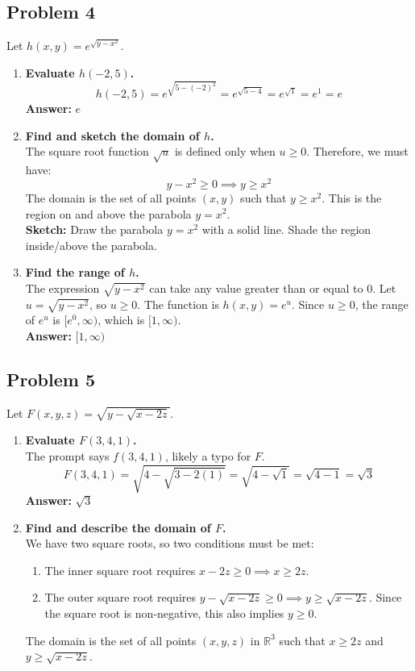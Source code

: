 \documentclass{article}
\begin{document}
\subsection{Problem 4}
Let $h(x, y) = e^{\sqrt{y - x^2}}$.
\begin{enumerate}[label=\alph*.]
    \item \textbf{Evaluate $h(-2, 5)$.} \\
    \[ h(-2, 5) = e^{\sqrt{5 - (-2)^2}} = e^{\sqrt{5-4}} = e^{\sqrt{1}} = e^1 = e \]
    \textbf{Answer:} $e$

    \item \textbf{Find and sketch the domain of $h$.} \\
    The square root function $\sqrt{u}$ is defined only when $u \ge 0$. Therefore, we must have:
    \[ y - x^2 \ge 0 \implies y \ge x^2 \]
    The domain is the set of all points $(x, y)$ such that $y \ge x^2$. This is the region on and above the parabola $y = x^2$. \\
    \textbf{Sketch:} Draw the parabola $y=x^2$ with a solid line. Shade the region inside/above the parabola.

    \item \textbf{Find the range of $h$.} \\
    The expression $\sqrt{y - x^2}$ can take any value greater than or equal to 0. Let $u = \sqrt{y - x^2}$, so $u \ge 0$. The function is $h(x, y) = e^u$. Since $u \ge 0$, the range of $e^u$ is $[e^0, \infty)$, which is $[1, \infty)$. \\
    \textbf{Answer:} $[1, \infty)$
\end{enumerate}

\subsection{Problem 5}
Let $F(x, y, z) = \sqrt{y - \sqrt{x - 2z}}$.
\begin{enumerate}[label=\alph*.]
    \item \textbf{Evaluate $F(3, 4, 1)$.} \\
    The prompt says $f(3,4,1)$, likely a typo for $F$.
    \[ F(3, 4, 1) = \sqrt{4 - \sqrt{3 - 2(1)}} = \sqrt{4 - \sqrt{1}} = \sqrt{4 - 1} = \sqrt{3} \]
    \textbf{Answer:} $\sqrt{3}$

    \item \textbf{Find and describe the domain of $F$.} \\
    We have two square roots, so two conditions must be met:
    \begin{enumerate}
        \item The inner square root requires $x - 2z \ge 0 \implies x \ge 2z$.
        \item The outer square root requires $y - \sqrt{x - 2z} \ge 0 \implies y \ge \sqrt{x - 2z}$. Since the square root is non-negative, this also implies $y \ge 0$.
    \end{enumerate}
    The domain is the set of all points $(x, y, z)$ in $\mathbb{R}^3$ such that $x \ge 2z$ and $y \ge \sqrt{x-2z}$.
\end{enumerate}
\end{document}

